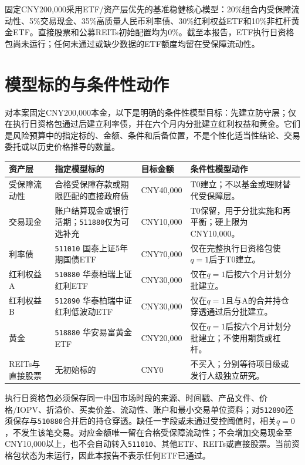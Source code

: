 \begin{houseviewbox}[核心结论]
固定CNY200,000采用ETF/资产层优先的基准稳健核心模型：20\%组合内受保障流动性、5\%交易现金、35\%高质量人民币利率债、30\%红利权益ETF和10\%非杠杆黄金ETF。直接股票和公募REITs初始配置均为0\%。截至本报告，ETF执行日资格包尚未运行；任何未通过或缺少数据的ETF额度均留在受保障流动性。
\end{houseviewbox}

\section{模型标的与条件性动作}

对本案固定CNY200,000本金，以下是明确的条件性模型目标：先建立防守层；仅在执行日资格包通过后建立利率债，并在六个月内分批建立红利权益和黄金。它们是风险预算中的指定标的、金额、条件和后备位置，不是个性化适当性结论、交易委托或以历史价格推导的数量。

\begin{exhibitbox}
\small
\begin{tabularx}{\exhibitboxwidth}{L{2.4cm}L{3.0cm}L{1.7cm}P}
\toprule
\textbf{资产层} & \textbf{指定模型标的} & \textbf{目标金额} & \textbf{条件性模型动作} \\
\midrule
受保障流动性 & 合格受保障存款或期限匹配的直接政府债 & CNY40,000 & T0建立；不以基金或理财替代受保障层。 \\
交易现金 & 账户结算现金或银行活期；\texttt{511880}仅为可选补充 & CNY10,000 & T0保留，用于分批实施和再平衡；硬上限为CNY10,000。 \\
利率债 & \texttt{511010} 国泰上证5年期国债ETF & CNY70,000 & 仅在完整执行日资格包使$q=1$后于T0建立。 \\
红利权益A & \texttt{510880} 华泰柏瑞上证红利ETF & CNY30,000 & 仅在$q=1$后按六个月计划分批建立。 \\
红利权益B & \texttt{512890} 华泰柏瑞中证红利低波动ETF & CNY30,000 & 仅在$q=1$且与A的合并持仓穿透通过后分批建立。 \\
黄金 & \texttt{518880} 华安易富黄金ETF & CNY20,000 & 仅在$q=1$后按六个月计划分批建立；不使用期货或杠杆。 \\
REITs与直接股票 & 无初始标的 & CNY0 & 不买入；分别等待项目级或发行人级独立研究。 \\
\bottomrule
\end{tabularx}
\end{exhibitbox}

执行日资格包必须保存同一中国市场时段的来源、时间戳、产品文件、价格/IOPV、折溢价、买卖价差、流动性、账户和最小交易单位资料；对\texttt{512890}还须保存与\texttt{510880}合并后的持仓穿透。缺任一字段或未通过受控阈值时，相关$q=0$，不发生该笔交易。对应金额唯一留在合格受保障流动性；不会增加交易现金至CNY10,000以上，也不会自动转入\texttt{511010}、其他ETF、REITs或直接股票。当前资格包状态为未运行，因此本报告不表示任何ETF已通过。


